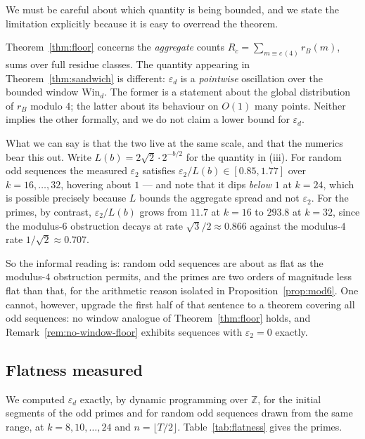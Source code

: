 \documentclass[11pt,a4paper]{article}
\theoremstyle{plain}
\theoremstyle{definition}
\theoremstyle{remark}
\begin{document}
We must be careful about which quantity is being bounded, and we state the
limitation explicitly because it is easy to overread the theorem.

Theorem~\ref{thm:floor} concerns the \emph{aggregate} counts
$R_c=\sum_{m\equiv c\,(4)}r_B(m)$, sums over full residue classes. The quantity
appearing in Theorem~\ref{thm:sandwich} is different: $\varepsilon_d$ is a
\emph{pointwise} oscillation over the bounded window $\mathrm{Win}_d$. The
former is a statement about the global distribution of $r_B$ modulo $4$; the
latter about its behaviour on $O(1)$ many points. Neither implies the other
formally, and we do not claim a lower bound for $\varepsilon_d$.

What we can say is that the two live at the same scale, and that the numerics
bear this out. Write $L(b)=2\sqrt2\cdot2^{-b/2}$ for the quantity in (iii).
For random odd sequences the measured $\varepsilon_2$ satisfies
$\varepsilon_2/L(b)\in[0.85,1.77]$ over $k=16,\dots,32$, hovering about $1$ ---
and note that it dips \emph{below} $1$ at $k=24$, which is possible precisely
because $L$ bounds the aggregate spread and not $\varepsilon_2$. For the primes,
by contrast, $\varepsilon_2/L(b)$ grows from $11.7$ at $k=16$ to $293.8$ at
$k=32$, since the modulus-$6$ obstruction decays at rate
$\sqrt3/2\approx0.866$ against the modulus-$4$ rate
$1/\sqrt2\approx0.707$.

So the informal reading is: random odd sequences are about as flat as the
modulus-$4$ obstruction permits, and the primes are two orders of magnitude
less flat than that, for the arithmetic reason isolated in
Proposition~\ref{prop:mod6}. One cannot, however, upgrade the first half of that
sentence to a theorem covering all odd sequences: no window analogue of
Theorem~\ref{thm:floor} holds, and Remark~\ref{rem:no-window-floor} exhibits
sequences with $\varepsilon_2=0$ exactly.

\subsection{Flatness measured}\label{sec:flatness-measured}

We computed $\varepsilon_d$ exactly, by dynamic programming over $\mathbb{Z}$,
for the initial segments of the odd primes and for random odd sequences drawn
from the same range, at $k=8,10,\dots,24$ and $n=\lfloor T/2\rfloor$.
Table~\ref{tab:flatness} gives the primes.
\end{document}
